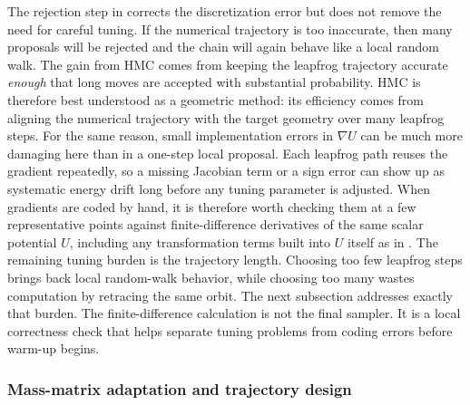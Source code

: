 The rejection step in  corrects the discretization error but does not remove the need for careful tuning.
If the numerical trajectory is too inaccurate, then many proposals will be rejected and the chain will again behave like a local random walk.
The gain from HMC comes from keeping the leapfrog trajectory accurate \emph{enough} that long moves are accepted with substantial probability.
HMC is therefore best understood as a geometric method: its efficiency comes from aligning the numerical trajectory with the target geometry over many leapfrog steps.
For the same reason, small implementation errors in $\nabla U$ can be much more damaging here than in a one-step local proposal.
Each leapfrog path reuses the gradient repeatedly, so a missing Jacobian term or a sign error can show up as systematic energy drift long before any tuning parameter is adjusted.
When gradients are coded by hand, it is therefore worth checking them at a few representative points against finite-difference derivatives of the same scalar potential $U$, including any transformation terms built into $U$ itself as in .
The remaining tuning burden is the trajectory length.
Choosing too few leapfrog steps brings back local random-walk behavior, while choosing too many wastes computation by retracing the same orbit.
The next subsection addresses exactly that burden.
The finite-difference calculation is not the final sampler.
It is a local correctness check that helps separate tuning problems from coding errors before warm-up begins.

\subsubsection{Mass-matrix adaptation and trajectory design}
\label{subsubsec:hmc-tuning}

